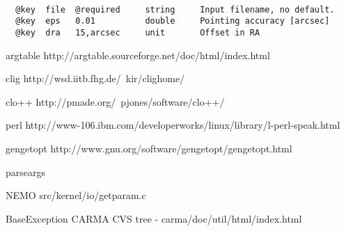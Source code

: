 \documentclass[preprint]{aastex} %
\begin{document}
\begin{verbatim}

  @key  file  @required     string     Input filename, no default.
  @key  eps   0.01          double     Pointing accuracy [arcsec]
  @key  dra   15,arcsec     unit       Offset in RA

\end{verbatim}

\begin{references}

argtable  http://argtable.sourceforge.net/doc/html/index.html

clig	  http://wsd.iitb.fhg.de/~kir/clighome/

clo++     http://pmade.org/~pjones/software/clo++/

perl      http://www-106.ibm.com/developerworks/linux/library/l-perl-speak.html

gengetopt http://www.gnu.org/software/gengetopt/gengetopt.html

parseargs

NEMO      src/kernel/io/getparam.c

BaseException	CARMA CVS tree - carma/doc/util/html/index.html

\end{references}
\end{document}
